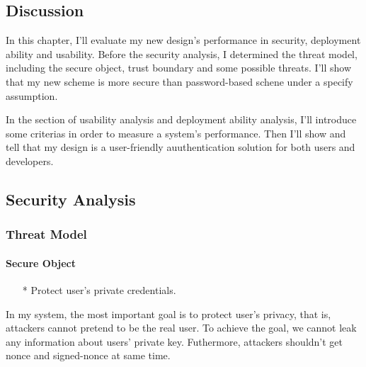 \begin{CJK}{Bg5}{bsmi}


\chapter{Discussion}

In this chapter, I'll evaluate my new design's performance in security, deployment ability and usability. Before the security analysis, I determined the threat model, including the secure object, trust boundary and some possible threats. I'll show that my new scheme is more secure than password-based schene under a specify assumption.

In the section of usability analysis and deployment ability analysis, I'll introduce some criterias in order to measure a system's performance. Then I'll show and tell that my design is a user-friendly auuthentication solution for both users and developers.

\section{Security Analysis}

\subsection{Threat Model}

\subsubsection{Secure Object}

\begin{enumerate}
\item[*] Protect user's private credentials.
\end{enumerate}

In my system, the most important goal is to protect user's privacy, that is, attackers cannot pretend to be the real user. To achieve the goal, we cannot leak any information about users' private key. Futhermore, attackers shouldn't get nonce and signed-nonce at same time.

\begin{comment}
[TODO]
enumerate the secure objectives
ADD CONCLUSION!!
\end{comment}


\end{CJK}
